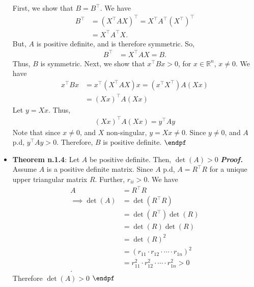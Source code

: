 \documentclass{report}
\begin{document}
\begin{itemize}
            \bigbreak \noindent 
            First, we show that $B = B^{\top}$. We have
            \begin{align*}
                B^{\top} &= (X^{\top}AX)^{\top} = X^{\top}A^{\top}(X^{\top})^{\top} \\
                &= X^{\top}A^{\top}X
            .\end{align*}
            But, $A$ is positive definite, and is therefore symmetric. So,
            \begin{align*}
                B^{\top} &= X^{\top}AX = B
            .\end{align*}
            Thus, $B$ is symmetric.
            \bigbreak \noindent 
            Next, we show that $x^{\top}Bx >0$, for $x \in \mathbb{R}^{n}$, $x\ne 0$. We have
            \begin{align*}
                x^{\top}Bx &= x^{\top}(X^{\top}AX)x = (x^{\top}X^{\top})A(Xx) \\
                &= (Xx)^{\top}A(Xx)
            \end{align*}
            Let $y = Xx$. Thus,
            \begin{align*}
                (Xx)^{\top}A(Xx) = y^{\top}Ay
            \end{align*}
            \bigbreak \noindent 
            Note that since $ x \ne 0 $, and $X$ non-singular, $y = Xx \ne 0$. Since $y \ne 0$, and $A$ p.d, $y^{\top}Ay >0$. 
            \bigbreak \noindent 
            Therefore, $B$ is positive definite. $\endpf $
        \item \textbf{Theorem n.1.4}: Let $A$ be positive definite. Then, $\det(A) > 0$
            \bigbreak \noindent 
            \textbf{\textit{Proof.}} Assume $A$ is a positive definite matrix.
            \bigbreak \noindent 
            Since $A$ p.d,  $A = R^{\top}R$ for a unique upper triangular matrix $R$. Further, $r_{ii} >0$. We have
            \begin{align*}
                A &= R^{\top}R \\
                \implies \det(A) &= \det(R^{\top}R) \\
                                 &= \det(R^{\top})\det(R) \\
                                 &= \det(R)\det(R) \\
                                 &= \det(R)^{2} \\
                                 &= (r_{11}\cdot r_{12}\cdot \cdots \cdot r_{1n})^{2} \\
                                 &= r_{11}^{2}\cdot r_{12}^{2}\cdot \cdots \cdot r_{1n}^{2} > 0 \\
            .\end{align*}
            Therefore $\det(A)  > 0$ $\endpf $




    \end{itemize}
\end{document}
